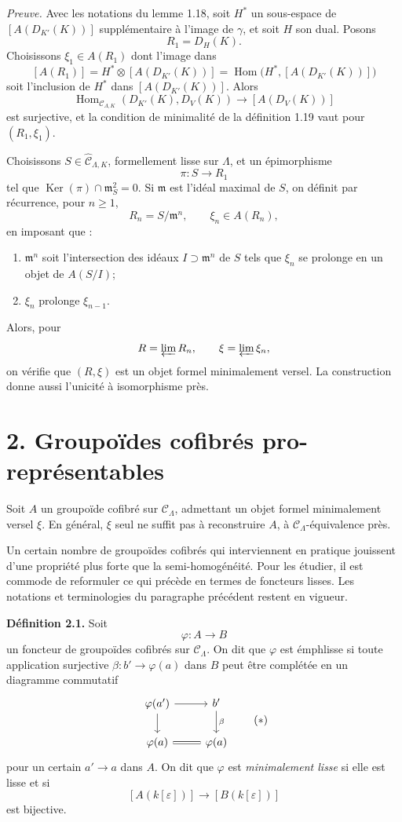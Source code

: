 \documentclass[11pt]{article}
\providecommand{\Ker}{\operatorname{Ker}}
\providecommand{\Hom}{\operatorname{Hom}}
\begin{document}
\emph{Preuve.} Avec les notations du lemme 1.18, soit \(H^\ast\) un sous-espace de
\([A(D_{K'}(K))]\) suppl\'ementaire \`a l'image de \(\gamma\), et soit \(H\) son dual.
Posons
\[
 R_1=D_H(K).
\]
Choisissons \(\xi_1\in A(R_1)\) dont l'image dans
\[
 [A(R_1)]=H^\ast\otimes[A(D_{K'}(K))]
 =\Hom\bigl(H^\ast,[A(D_{K'}(K))]\bigr)
\]
soit l'inclusion de \(H^\ast\) dans \([A(D_{K'}(K))]\). Alors
\[
 \Hom_{\mathcal C_{\Lambda,K}}(D_{K'}(K),D_V(K))
 \longrightarrow [A(D_V(K))]
\]
est surjective, et la condition de minimalit\'e de la d\'efinition 1.19 vaut pour
\((R_1,\xi_1)\).

Choisissons \(S\in\widehat{\mathcal C}_{\Lambda,K}\), formellement lisse sur \(\Lambda\),
et un \'epimorphisme
\[
 \pi:S\longrightarrow R_1
\]
tel que \(\Ker(\pi)\cap\mathfrak m_S^2=0\). Si \(\mathfrak m\) est l'id\'eal maximal
de \(S\), on d\'efinit par r\'ecurrence, pour \(n\geq1\),
\[
 R_n=S/\mathfrak m^n,\qquad \xi_n\in A(R_n),
\]
en imposant que :
\begin{enumerate}[label=(\alph*)]
\item \(\mathfrak m^n\) soit l'intersection des id\'eaux \(I\supset\mathfrak m^n\) de \(S\)
tels que \(\xi_n\) se prolonge en un objet de \(A(S/I)\);
\item \(\xi_n\) prolonge \(\xi_{n-1}\).
\end{enumerate}
Alors, pour
\[
 R=\varprojlim R_n,\qquad \xi=\varprojlim \xi_n,
\]
on v\'erifie que \((R,\xi)\) est un objet formel minimalement versel. La construction donne
aussi l'unicit\'e \`a isomorphisme pr\`es.

\section*{2. Groupo\"ides cofibr\'es pro-repr\'esentables}

Soit \(A\) un groupo\"ide cofibr\'e sur \(\mathcal C_\Lambda\), admettant un objet formel
minimalement versel \(\xi\). En g\'en\'eral, \(\xi\) seul ne suffit pas \`a reconstruire
\(A\), \`a \(\mathcal C_\Lambda\)-\'equivalence pr\`es.

Un certain nombre de groupo\"ides cofibr\'es qui interviennent en pratique jouissent d'une
propri\'et\'e plus forte que la semi-homog\'en\'eit\'e. Pour les \'etudier, il est commode de
reformuler ce qui pr\'ec\`ede en termes de foncteurs lisses. Les notations et terminologies
du paragraphe pr\'ec\'edent restent en vigueur.

\textbf{D\'efinition 2.1.} Soit
\[
 \varphi:A\longrightarrow B
\]
un foncteur de groupo\"ides cofibr\'es sur \(\mathcal C_\Lambda\). On dit que \(\varphi\)
est émph{lisse} si toute application surjective
\(\beta:b'\to\varphi(a)\) dans \(B\) peut \^etre compl\'et\'ee en un diagramme commutatif
\[
\begin{tikzcd}
\varphi(a') \arrow[r] \arrow[d] & b' \arrow[d,"\beta"]\\
\varphi(a) \arrow[r,equal] & \varphi(a)
\end{tikzcd}
\tag{\(*\)}
\]
pour un certain \(a'\to a\) dans \(A\). On dit que \(\varphi\) est
\emph{minimalement lisse} si elle est lisse et si
\[
 [A(k[\varepsilon])]\longrightarrow [B(k[\varepsilon])]
\]
est bijective.
\end{document}
